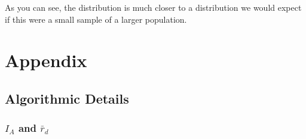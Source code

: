 \documentclass[letterpaper]{article}
\begin{document}
As you can see, the distribution is much closer to a distribution we would expect if this were a small sample of a larger population. 


\section{Appendix}
\subsection{Algorithmic Details}
\subsubsection{$I_A$ and $\bar r_d$}
\end{document}
